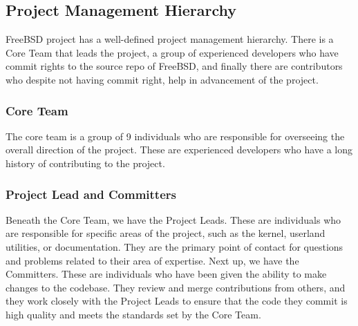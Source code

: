 \documentclass[12pt, dvipsnames, a4paper]{article}
\begin{document}
\subsection{Project Management Hierarchy}
FreeBSD project has a well-defined project management hierarchy. There is a Core Team that leads the project, a group of experienced developers who have commit rights to the source repo of FreeBSD, and finally there are contributors who despite not having commit right, help in advancement of the project.
\subsubsection{Core Team}
The core team is a group of 9 individuals who are responsible for overseeing the overall direction of the project. These are experienced developers who have a long history of contributing to the project.
\subsubsection{Project Lead and Committers}
Beneath the Core Team, we have the Project Leads. These are individuals who are responsible for specific areas of the project, such as the kernel, userland utilities, or documentation. They are the primary point of contact for questions and problems related to their area of expertise. Next up, we have the Committers. These are individuals who have been given the ability to make changes to the codebase. They review and merge contributions from others, and they work closely with the Project Leads to ensure that the code they commit is high quality and meets the standards set by the Core Team.
\end{document}
